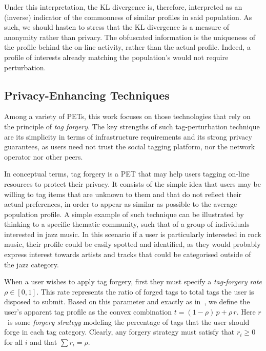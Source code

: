 Under this interpretation, the KL divergence is, therefore, interpreted as an (inverse) indicator of the commonness of similar profiles in said population. As such, we should hasten to stress that the KL divergence is a measure of anonymity rather than privacy. The obfuscated information is the uniqueness of the profile behind the on-line activity, rather than the actual profile. Indeed, a profile of interests already matching the population's would not require perturbation.

\subsection{Privacy-Enhancing Techniques}
\label{sec:pets}
Among a variety of PETs, this work focuses on those technologies that rely on the principle of \emph{tag forgery}. The key strengths of such tag-perturbation technique are its simplicity in terms of infrastructure requirements and its strong privacy guarantees, as users need not trust the social tagging platform, nor the network operator nor other peers.

In conceptual terms, tag forgery is a PET that may help users tagging on-line resources to protect their privacy. It consists of the simple idea that users may be willing to tag items that are unknown to them and that do not reflect their actual preferences, in order to appear as similar as possible to the average population profile. A simple example of such technique can be illustrated by thinking to a specific thematic community, such that of a group of individuals interested in jazz music. In this scenario if a user is particularly interested in rock music, their profile could be easily spotted and identified, as they would probably express interest towards artists and tracks that could be categorised outside of the jazz category.

When a user wishes to apply tag forgery, first they must specify a \emph{tag-forgery rate} $\rho \in [0,1]$. This rate represents the ratio of forged tags to total tags the user is disposed to submit.
Based on this parameter and exactly as in~\cite{Rebollo10IT}, we define the user's apparent tag profile as the convex combination $t = (1 - \rho)\,p + \rho\,r $.
Here $r$~is some \emph{forgery strategy} modeling the percentage of tags that the user should forge in each tag category.
Clearly, any forgery strategy must satisfy that $r_i \geqslant 0$ for all $i$ and that $\sum r_i = \rho$.

